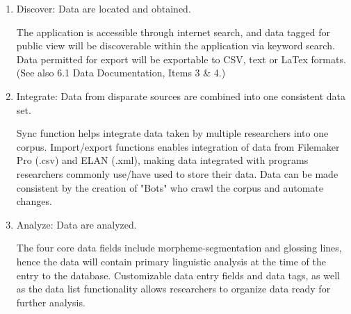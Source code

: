 \documentclass[12 pt]{article}
\begin{document}
\begin{enumerate}
\item Discover: Data are located and obtained. 

The application is accessible through internet search, and data tagged for public view will be discoverable within the application via keyword search. Data permitted for export will be exportable to CSV, text or LaTex formats.  (See also 6.1 Data Documentation, Items 3 \& 4.)

\item Integrate: Data from disparate sources are combined into one consistent data set. 

Sync function helps integrate data taken by multiple researchers into one corpus. Import/export functions enables integration of data from Filemaker Pro (.csv) and ELAN (.xml), making data integrated with programs researchers commonly use/have used to store their data. Data can be made consistent by the creation of "Bots" who crawl the corpus and automate changes.

\item Analyze: Data are analyzed. 

The four core data fields include morpheme-segmentation and glossing lines, hence the data will contain primary linguistic analysis at the time of the entry to the database. 
Customizable data entry fields and data tags, as well as the data list  functionality allows researchers to organize data ready for further analysis.   

\end{enumerate} 
\end{document}
